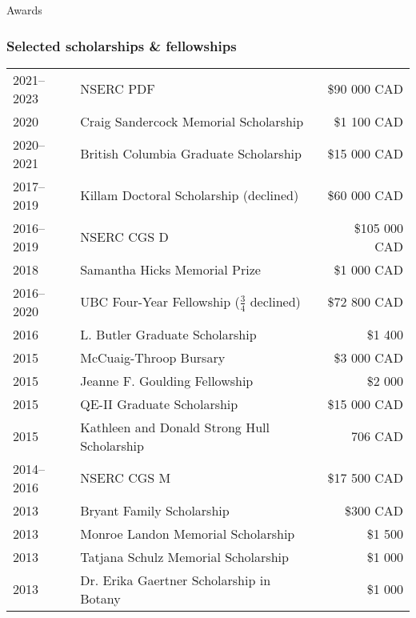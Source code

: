 \documentclass[11pt]{article}
\begin{document}
\noindent\begin{rSection}{Awards}

\subsubsection*{Selected scholarships \& fellowships}
\begin{tabular}{llr}

2021--2023 & NSERC PDF &  \$90 000 CAD\\
2020 & Craig Sandercock Memorial Scholarship & \$1 100 CAD\\
2020--2021 & British Columbia Graduate Scholarship & \$15 000 CAD\\
2017--2019 & Killam Doctoral Scholarship (declined) & \$60 000 CAD\\
2016--2019 & NSERC CGS D &  \$105 000 CAD\\
2018 & Samantha Hicks Memorial Prize & \$1 000 CAD \\
2016--2020 & UBC Four-Year Fellowship ($\frac{3}{4}$ declined) & \$72 800 CAD\\
2016 & L. Butler Graduate Scholarship & \$1 400\\
2015 & McCuaig-Throop Bursary & \$3 000 CAD\\
2015 & Jeanne F. Goulding Fellowship & \$2 000\\
2015 & QE-II Graduate Scholarship & \$15 000 CAD\\
2015 & Kathleen and Donald Strong Hull Scholarship & 706 CAD\\
2014--2016 & NSERC CGS M & \$17 500 CAD\\
2013 & Bryant Family Scholarship & \$300 CAD\\ %
2013 & Monroe Landon Memorial Scholarship & \$1 500\\
2013 & Tatjana Schulz Memorial Scholarship & \$1 000\\
2013 & Dr. Erika Gaertner Scholarship in Botany & \$1 000\\
\end{tabular}



\end{rSection}
\end{document}
